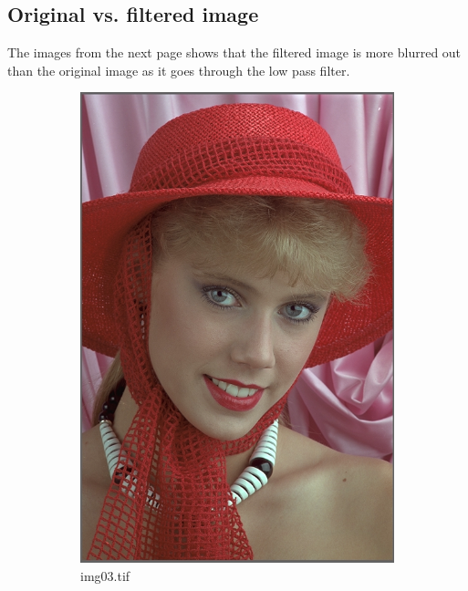 \documentclass{article}
\begin{document}
\subsection{Original vs. filtered image}
The images from the next page shows that the filtered image is more blurred out than the original image as it goes through the low pass filter.
\pagebreak
\begin{figure}[h]
\begin{subfigure}{0.5\textwidth}
\includegraphics[width=0.9\linewidth, left]{img03} 
\caption{img03.tif}
\end{subfigure}
\begin{subfigure}{0.5\textwidth}

\end{subfigure}
\end{figure}
\end{document}
